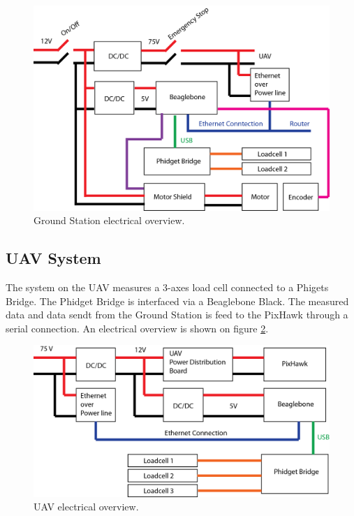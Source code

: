 \begin{figure}[hbtp]
\centering
\includegraphics[scale=0.75]{graphics/GCS-eltectrical-overview.png}
\caption{Ground Station electrical overview.}
\label{fig:GCS-elec}
\end{figure}


\subsection{UAV System}
The system on the UAV measures a 3-axes load cell connected to a Phigets Bridge. The Phidget Bridge is interfaced via a Beaglebone Black. The measured data and data sendt from the Ground Station is feed to the PixHawk through a serial connection. An electrical overview is shown on figure \ref{fig:FCS-elec}.

\begin{figure}[hbtp]
\centering
\includegraphics[scale=0.75]{graphics/UAV-electrical-system.png}
\caption{UAV electrical overview.}
\label{fig:FCS-elec}
\end{figure}

